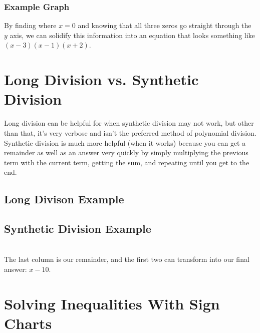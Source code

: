 \documentclass[12pt, english]{article}
\begin{document}
	\subsubsection*{Example Graph}
		\begin{center}
	\end{center}
	By finding where $x = 0$ and knowing that all three zeros go straight through the $y$ axis, we can solidify this information into an equation
	that looks something like $(x-3)(x-1)(x+2)$.
	\section{Long Division vs. Synthetic Division}
	Long division can be helpful for when synthetic division may not work, but other than that, it's very verbose and isn't the preferred method of
	polynomial division. Synthetic division is much more helpful (when it works) because you can get a remainder as well as an answer very
	quickly by simply multiplying the previous term with the current term, getting the sum, and repeating until you get to the end.
	\subsection{Long Divison Example}
	\subsection{Synthetic Division Example}
	\\
	The last column is our remainder, and the first two can transform into our final answer: $x - 10$.
	\section{Solving Inequalities With Sign Charts}
\end{document}
